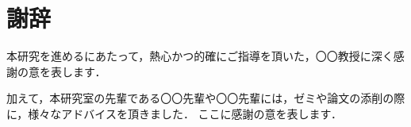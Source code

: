\chapter*{謝辞}
\pagestyle{plain}
\pagestyle{fancyplain}

本研究を進めるにあたって，熱心かつ的確にご指導を頂いた，〇〇教授に深く感謝の意を表します．


加えて，本研究室の先輩である〇〇先輩や〇〇先輩には，ゼミや論文の添削の際に，様々なアドバイスを頂きました．
ここに感謝の意を表します．